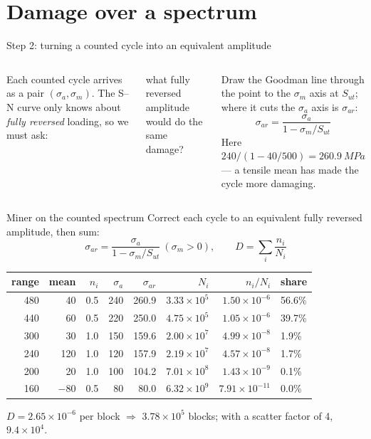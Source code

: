 \documentclass[aspectratio=169,10pt]{beamer}
\begin{document}
\section{Damage over a spectrum}


\begin{frame}{Step 2: turning a counted cycle into an equivalent amplitude}
\begin{columns}[T]
\centering

\footnotesize
Each counted cycle arrives as a pair $(\sigma_a,\sigma_m)$. The S--N curve only knows about \emph{fully reversed} loading, so we must ask:
\vspace{2pt}

\alert{what fully reversed amplitude would do the same damage?}
\vspace{4pt}

Draw the Goodman line through the point to the $\sigma_m$ axis at $S_{ut}$; where it cuts the $\sigma_a$ axis is $\sigma_{ar}$:
\[
\sigma_{ar}=\frac{\sigma_a}{1-\sigma_m/S_{ut}}
\]
Here $240/(1-40/500)=\SI{260.9}{MPa}$ --- a tensile mean has made the cycle \alert{more} damaging.
\end{columns}
\end{frame}

\begin{frame}{Miner on the counted spectrum}
Correct each cycle to an equivalent fully reversed amplitude, then sum:
\[
\sigma_{ar}=\frac{\sigma_a}{1-\sigma_m/S_{ut}}\ (\sigma_m>0),\qquad
D=\sum_i\frac{n_i}{N_i}
\]
\centering\footnotesize
\begin{tabular}{@{}rrrrrrrl@{}}
\toprule
range & mean & $n_i$ & $\sigma_a$ & $\sigma_{ar}$ & $N_i$ & $n_i/N_i$ & share \\
\midrule
480 &  40 & 0.5 & 240 & 260.9 & $3.33\times10^{5}$ & $1.50\times10^{-6}$ & \alert{56.6\%} \\
440 &  60 & 0.5 & 220 & 250.0 & $4.75\times10^{5}$ & $1.05\times10^{-6}$ & \alert{39.7\%} \\
300 &  30 & 1.0 & 150 & 159.6 & $2.00\times10^{7}$ & $4.99\times10^{-8}$ & 1.9\% \\
240 & 120 & 1.0 & 120 & 157.9 & $2.19\times10^{7}$ & $4.57\times10^{-8}$ & 1.7\% \\
200 &  20 & 1.0 & 100 & 104.2 & $7.01\times10^{8}$ & $1.43\times10^{-9}$ & 0.1\% \\
160 & $-80$ & 0.5 & 80 & 80.0 & $6.32\times10^{9}$ & $7.91\times10^{-11}$ & 0.0\% \\
\bottomrule
\end{tabular}
\vspace{3pt}

\raggedright\normalsize
$D=2.65\times10^{-6}$ per block $\Rightarrow$ $3.78\times10^{5}$ blocks; with a scatter factor of 4, $9.4\times10^{4}$.
\end{frame}
\end{document}
